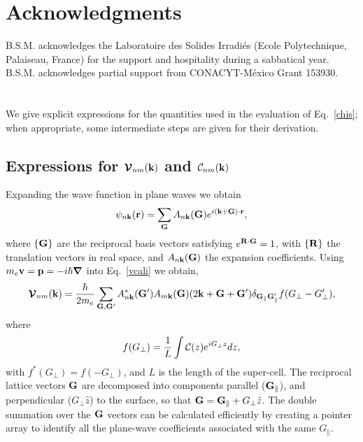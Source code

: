 \documentclass[floatfix,prb,aps,superscriptaddress,11pt,preprint,letterpaper]{revtex4}
\begin{document}
\section{Acknowledgments}


B.S.M. acknowledges the Laboratoire des Solides Irradi\'es (Ecole
Polytechnique, Palaiseau, France) for the support and hospitality
during a sabbatical year. B.S.M. acknowledges partial support from
CONACYT-M\'exico Grant 153930. 

\appendix 
\section{}\label{appe}
We give explicit expressions for the quantities used in the evaluation 
of Eq.~\eqref{chis}; when appropriate, some 
intermediate steps are given for their derivation. 
\subsection{ Expressions for 
\texorpdfstring{${\boldsymbol{\mathcal{\cal V}}}_{nm}(\mathbf{k})$}{que} 
and 
\texorpdfstring{${\cal C}_{nm}(\mathbf{k})$}{que}
}\label{calpcalc}

Expanding the wave function in plane waves we obtain
\begin{align}\label{eni.1}
\psi_{n\mathbf{k}}(\mathbf{r})=\sum_{\mathbf{G}} A_{n\mathbf{k}}(\mathbf{G})e^{i(\mathbf{k}+\mathbf{G})\cdot\mathbf{r}}
,
\end{align}
where $\{\mathbf{G}\}$ are the reciprocal basis vectors satisfying
$e^{\mathbf{R}\cdot\mathbf{G}}=1$, with $\{\mathbf{R}\}$ the translation vectors in real
space, and $A_{n\mathbf{k}}(\mathbf{G})$ the expansion coefficients. Using
$m_e\mathbf{v}=\mathbf{p}=-i\hbar\boldsymbol{\nabla}$ into 
Eq.~\eqref{vcali}
we obtain,\cite{mendozaPRB06}
\begin{align}\label{eni.2}
\boldsymbol{\mathcal{\cal V}}_{nm}(\mathbf{k})=
\frac{\hbar}{2m_e}
\sum_{\mathbf{G},\mathbf{G}'} A^*_{n\mathbf{k}}(\mathbf{G}')  A_{m\mathbf{k}}(\mathbf{G})
(2\mathbf{k}+\mathbf{G}+\mathbf{G}')
\delta_{\mathbf{G}_\parallel \mathbf{G}'_\parallel}  
f(G_\perp-G'_\perp)
,
\end{align}   
where
\begin{align}\label{vnl.9}
f(G_\perp)=\frac{1}{L}\int{\mathbf{\cal C}}(z) e^{iG_\perp z}dz  
 ,
\end{align}
with $f^*(G_\perp)=f(-G_\perp)$,
and $L$
is the length of the super-cell. 
The reciprocal lattice vectors $\mathbf{G}$ are 
decomposed into components
parallel ($\mathbf{G}_\parallel$), and perpendicular ($G_\perp \hat z$)
to the surface, so
that $\mathbf{G} = \mathbf{G}_\parallel + G_\perp\hat z$.
The double summation over the $\mathbf{G}$ vectors can be 
calculated efficiently by  
creating a pointer array to identify all the plane-wave coefficients  
associated with the same $G_\parallel$.  
\end{document}
